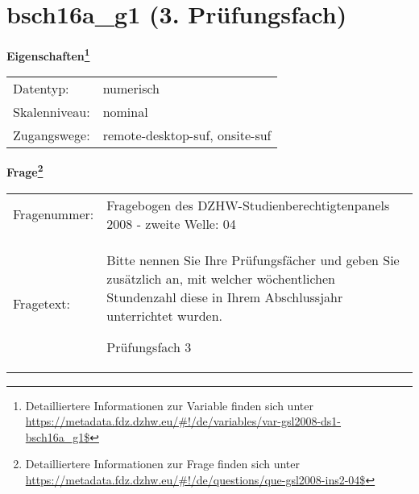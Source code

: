 
    \setcounter{footnote}{0}

    \vspace*{-1.8cm}
	\section{bsch16a\_g1 (3. Prüfungsfach)}
	\label{section:bsch16a_g1}



    \vspace*{0.5cm}
    \noindent\textbf{Eigenschaften\footnote{Detailliertere Informationen zur Variable finden sich unter
		\url{https://metadata.fdz.dzhw.eu/\#!/de/variables/var-gsl2008-ds1-bsch16a_g1$}}}\\
	\begin{tabularx}{\hsize}{@{}lX}
	Datentyp: & numerisch \\
	Skalenniveau: & nominal \\
	Zugangswege: &
	  remote-desktop-suf, 
	  onsite-suf
 \\
    \end{tabularx}



				\vspace*{0.5cm}
                \noindent\textbf{Frage\footnote{Detailliertere Informationen zur Frage finden sich unter
		              \url{https://metadata.fdz.dzhw.eu/\#!/de/questions/que-gsl2008-ins2-04$}}}\\
				\begin{tabularx}{\hsize}{@{}lX}
					Fragenummer: &
					  Fragebogen des DZHW-Studienberechtigtenpanels 2008 - zweite Welle:
					  04
 \\
					Fragetext: & Bitte nennen Sie Ihre Prüfungsfächer und geben Sie zusätzlich an, mit welcher wöchentlichen Stundenzahl diese in Ihrem Abschlussjahr unterrichtet wurden.\par  Prüfungsfach 3 \\
				\end{tabularx}





